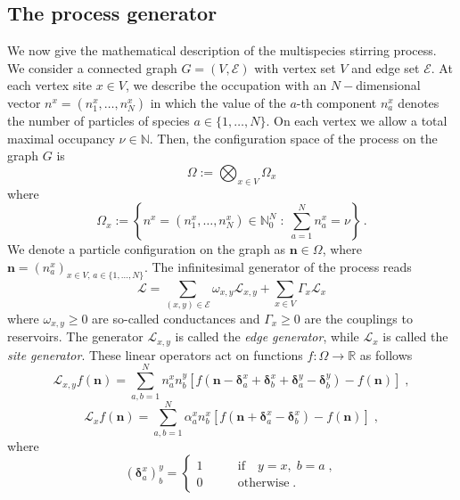 \documentclass[10pt]{article}
\numberwithin{equation}{section}
\numberwithin{equation}{subsection}
\newcommand{\co}{\;,}
\newcommand{\dt}{\;.}
\newcommand{\twoj}{\nu}
\begin{document}
\subsection{The process generator}\label{subsectionGeneratorStr}
We now give the mathematical description of the multispecies stirring process.
We consider a connected graph $G=(V,\mathcal{E})$ with vertex set $V$ and edge set $\mathcal{E}$.
At each vertex site $x\in V$, we describe the occupation with an $N-$dimensional vector $n^{x}=(n_{1}^{x},\ldots,n_{N}^{x})$ in which the value of the $a$-th component $n_{a}^{x}$ denotes the number of particles of species $a\in \{1,\ldots,N\}$. On each vertex we allow a total  maximal occupancy $\nu\in \mathbb{N}$. Then, the configuration space of the process on the graph $G$ is 
\begin{equation}\label{stateSpace}
    \Omega:=\bigotimes_{x\in V} \Omega_{x}
\end{equation}
where
\begin{equation}
\Omega_{x}:=\left\{n^x=(n_{1}^{x},\ldots,n_{N}^{x})\in\mathbb{N}_0^{N}\;:\; \sum_{a=1}^{N}n_{a}^{x}=\twoj\right\}\,.
\end{equation}
We denote a particle configuration on the graph as $\bm{n}\in \Omega$, where $\bm{n}=(n_{a}^{x})_{x\in V,\,a\in\{1,\ldots,N\}}$.
The infinitesimal generator of the process reads
\begin{equation}\label{Generator}
    \mathcal{L}=\sum_{(x,y)\in \mathcal{E}}\omega_{x,y}\mathcal{L}_{x,y}+\sum_{x\in V}\Gamma_{x}\mathcal{L}_{x}
\end{equation}
where  $ \omega_{x,y}\geq 0$ are so-called conductances and $\Gamma_{x}\geq 0$ are the couplings to reservoirs. 
The generator $\mathcal{L}_{x,y}$ is called the \textit{edge generator}, while $\mathcal{L}_{x}$ is called the \textit{site generator}. These linear operators act on functions $f:\Omega\to \mathbb{R}$ as follows
\begin{equation}\label{edgeGenerator}
\mathcal{L}_{x,y}f(\bm{n})=\sum_{a,b=1}^{N}n_{a}^{x}n_{b}^{y}\left[f(\bm{n}-\bm{\delta}^{x}_{a}+\bm{\delta}_{b}^{x}+\bm{\delta}_{a}^{y}-\bm{\delta}_{b}^{y})-f(\bm{n})\right]\co
\end{equation}
\begin{equation}\label{siteGenerator}
    \mathcal{L}_{x}f(\bm{n})=\sum_{a,b=1}^{N}\alpha_{a}^{x}n_{b}^{x}\left[f(\bm{n}+\bm{\delta}_{a}^{x}-\bm{\delta}_{b}^{x})-f(\bm{n})\right]\co
\end{equation}
where 
\begin{equation}
(\bm{\delta}_{a}^{x})^{y}_{b}=\begin{cases}
1\qquad &\text{if}\quad y=x,\;b=a\;,\\
0\qquad &\text{otherwise}\dt
\end{cases}
\end{equation}
\end{document}

